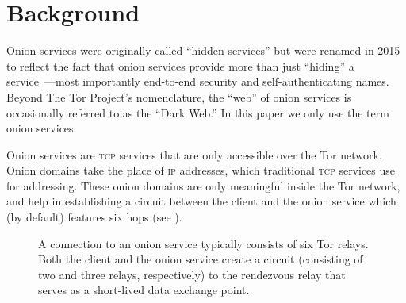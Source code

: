 \section{Background}
\label{sec:background}

Onion services were originally called ``hidden services'' but were renamed in
2015 to reflect the fact that onion services provide more than just ``hiding'' a
service~\cite{Johnson2015a}---most importantly end-to-end security and
self-authenticating names.  Beyond The Tor Project's nomenclature, the ``web''
of onion services is occasionally referred to as the ``Dark Web.''  In this
paper we only use the term onion services.

Onion services are \textsc{tcp} services that are only accessible over the Tor
network.  Onion domains take the place of \textsc{ip} addresses, which
traditional \textsc{tcp} services use for addressing.  These onion domains are
only meaningful inside the Tor network, and help in establishing a circuit
between the client and the onion service which (by default) features six hops
(see ).

\begin{figure}[t]
\centering
{}
\caption{A connection to an onion service typically consists of six Tor relays.
Both the client and the onion service create a circuit (consisting of two and
three relays, respectively) to the rendezvous relay that serves as a short-lived
data exchange point.}
\label{fig:onion-connection}
\end{figure}

